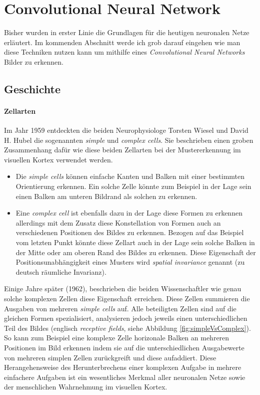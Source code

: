 \section{Convolutional Neural Network} \label{sc:cnn}
Bisher wurden in erster Linie die Grundlagen für die heutigen neuronalen Netze erläutert. Im kommenden Abschnitt werde ich grob darauf eingehen wie man diese Techniken nutzen kann um mithilfe eines \emph{Convolutional Neural Networks} Bilder zu erkennen. 


\subsection{Geschichte}

\paragraph{Zellarten} 
Im Jahr 1959 entdeckten die beiden Neurophysiologe Torsten Wiesel und David H. Hubel die sogenannten \emph{simple} und \emph{complex cells}. Sie beschrieben einen groben Zusammenhang dafür wie diese beiden Zellarten bei der Mustererkennung im visuellen Kortex verwendet werden. 

\begin{itemize}
\item Die \emph{simple cells} können einfache Kanten und Balken mit einer bestimmten Orientierung erkennen. Ein solche Zelle könnte zum Beispiel in der Lage sein einen Balken am unteren Bildrand als solchen zu erkennen. 

\item Eine \emph{complex cell} ist ebenfalls dazu in der Lage diese Formen zu erkennen allerdings mit dem Zusatz diese Konstellation von Formen auch an verschiedenen Positionen des Bildes zu erkennen. Bezogen auf das Beispiel vom letzten Punkt könnte diese Zellart auch in der Lage sein solche Balken in der Mitte oder am oberen Rand des Bildes zu erkennen. Diese Eigenschaft der Positionsunabhängigkeit eines Musters wird \emph{spatial invariance} genannt (zu deutsch \glqq räumliche Invarianz\grqq ).
\end{itemize}

Einige Jahre später (1962), beschrieben die beiden Wissenschaftler wie genau solche komplexen Zellen diese Eigenschaft erreichen. Diese Zellen summieren die Ausgaben von mehreren \emph{simple cells} auf. Alle beteiligten Zellen sind auf die gleichen Formen spezialisiert, analysieren jedoch jeweils einen unterschiedlichen Teil des Bildes (englisch \emph{receptive fields}, siehe Abbildung \ref{fig:simpleVsComplex}). So kann zum Beispiel eine komplexe Zelle horizonale Balken an mehreren Positionen im Bild erkennen indem sie auf die unterschiedlichen Ausgabewerte von mehreren simplen Zellen zurückgreift und diese aufaddiert. Diese Herangehensweise des Herunterbrechens einer komplexen Aufgabe in mehrere einfachere Aufgaben ist ein wesentliches Merkmal aller neuronalen Netze sowie der menschlichen Wahrnehmung im visuellen Kortex. 

